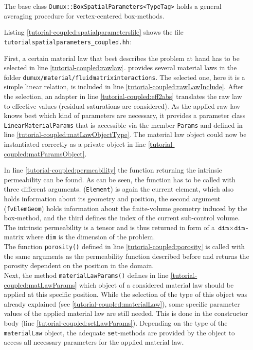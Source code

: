 The base class \texttt{Dumux::BoxSpatialParameters<TypeTag>} holds a general 
averaging procedure for vertex-centered box-methods.

Listing \ref{tutorial-coupled:spatialparametersfile} shows the file
\verb+tutorialspatialparameters_coupled.hh+:

\begin{lst}\label{tutorial-coupled:spatialparametersfile} \mbox{}

\end{lst}

First, a certain material law that best describes the problem at hand has to
be selected in line \ref{tutorial-coupled:rawlaw}\label{tutorial-coupled:materialLaw}. 
\Dumux provides several material laws in the folder 
\verb+dumux/material/fluidmatrixinteractions+.
The selected one, here it is a simple linear relation, is included
in line \ref{tutorial-coupled:rawLawInclude}. After the selection,
an adapter in line \ref{tutorial-coupled:eff2abs} translates the raw 
law to effective values (residual saturations are considered). As the
applied raw law knows best which kind of parameters are necessary,
it provides a parameter class \texttt{LinearMaterialParams} that is
accessible via the member \texttt{Params} and defined in line 
\ref{tutorial-coupled:matLawObjectType}. The material law object 
could now be instantiated correctly as a private object
in line \ref{tutorial-coupled:matParamsObject}.

In line \ref{tutorial-coupled:permeability} the function returning the
intrinsic permeability can be found. As can be seen, the function has
to be called with three different arguments. 
(\texttt{Element}) is again the current element, which also holds information
about its geometry and position, the second argument
(\texttt{fvElemGeom}) holds information about the finite-volume geometry induced
by the box-method, and the third defines the index of the current sub-control 
volume. The intrinsic permeability is a tensor and is thus returned in form of
a $\texttt{dim} \times \texttt{dim}$-matrix where \texttt{dim} is the dimension 
of the problem.\\
The function \texttt{porosity()} defined in line
\ref{tutorial-coupled:porosity} is called with the same arguments as
the permeability function described before and returns the porosity
dependent on the position in the domain.\\
Next, the method \texttt{materialLawParams()} defines in line 
\ref{tutorial-coupled:matLawParams} which object of a considered 
material law should be applied at this specific position. 
While the selection of the type of this object was already explained (see 
\ref{tutorial-coupled:materialLaw}), some specific parameter 
values of the applied material law are still needed. This is 
done in the constructor body (line \ref{tutorial-coupled:setLawParams}).
Depending on the type of the \texttt{materialLaw} object, the adequate \texttt{set}-methods
are provided by the object to access all necessary parameters 
for the applied material law.

